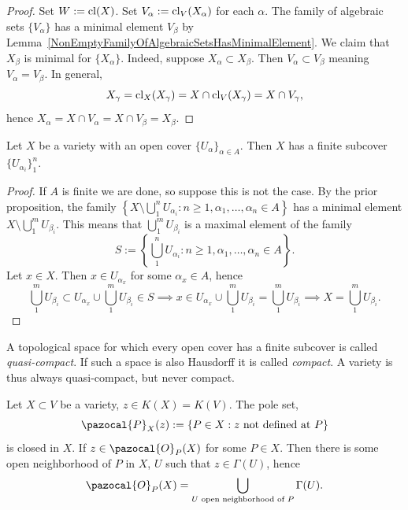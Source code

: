     \begin{proof}
        Set $W:=\mathrm{cl}(X)$. Set $V_\alpha:= \mathrm{cl}_V(X_\alpha)$ for each $\alpha$. The family of algebraic sets $\{V_\alpha\}$ has a minimal element $V_\beta$ by Lemma~\ref{NonEmptyFamilyOfAlgebraicSetsHasMinimalElement}. We claim that $X_\beta$ is minimal for $\{X_\alpha\}$. Indeed, suppose $X_\alpha \subset X_\beta$. Then $V_\alpha\subset V_\beta$ meaning  $V_\alpha =V_\beta$. In general, 
        $$
            X_\gamma = \mathrm{cl}_X(X_\gamma)=X\cap \mathrm{cl}_V(X_\gamma)= X\cap V_\gamma,
        $$ 
        hence $X_\alpha = X\cap V_\alpha = X\cap V_\beta = X_\beta$. 
    \end{proof}
    \begin{proposition}
        Let $X$ be a variety with an open cover $\{U_\alpha\}_{\alpha \in A}$. Then $X$ has a finite subcover $\{U_{\alpha_i}\}_1^n$.
    \end{proposition}
    \begin{proof}
        If $A$ is finite we are done, so suppose this is not the case. By the prior proposition, the family $\left\{ X\setminus \bigcup_1^n U_{\alpha_i} : n\geq 1, \alpha_1,\dots,\alpha_n\in A\right\}$ has a minimal element $X\setminus \bigcup_1^m U_{\beta_i}$. This means that $\bigcup_1^m U_{\beta_i}$ is a maximal element of the family 
        $$S:= \left\{ \bigcup_1^n U_{\alpha_i} : n\geq 1, \alpha_1,\dots,\alpha_n\in A\right\}.$$
        Let $x\in X$. Then $x\in U_{\alpha_x}$ for some $\alpha_x\in A$, hence 
        $$\bigcup_1^m U_{\beta_i} \subset U_{\alpha_x}\cup \bigcup_1^m U_{\beta_i}\in S \implies x\in U_{\alpha_x}\cup \bigcup_1^m U_{\beta_i} = \bigcup_1^m U_{\beta_i} \implies X= \bigcup_1^m U_{\beta_i}.$$
    \end{proof}
    \begin{remark}
        A topological space for which every open cover has a finite subcover is called \emph{quasi-compact}. If such a space is also Hausdorff it is called \emph{compact}. A variety is thus always quasi-compact, but never compact.  
    \end{remark}
    \begin{lemma}
        Let $X\subset V$ be a variety, $z\in K(X)=K(V)$. The pole set, 
        $$
            \pazocal{P}_X(z):= \{P \in X: z \text{ not defined at }P\}
        $$ 
        is closed in $X$. If $z\in \pazocal{O}_P(X)$ for some $P\in X$. Then there is some open neighborhood of $P$ in $X$, $U$ such that $z\in\Gamma(U)$, hence 
        $$\pazocal{O}_P(X)=\bigcup_{U\text{ open neighborhood of } P} \Gamma(U).$$
    \end{lemma}
